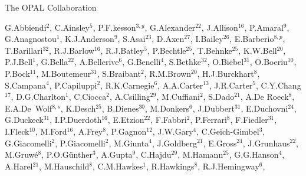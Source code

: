\documentclass[12pt,a4paper,twoside]{article}
\begin{document}
\begin{center}{\Large        The OPAL Collaboration
}\end{center}\bigskip
\begin{center}{
G.\thinspace Abbiendi$^{  2}$,
C.\thinspace Ainsley$^{  5}$,
P.F.\thinspace {\AA}kesson$^{  3,  y}$,
G.\thinspace Alexander$^{ 22}$,
J.\thinspace Allison$^{ 16}$,
P.\thinspace Amaral$^{  9}$,
G.\thinspace Anagnostou$^{  1}$,
K.J.\thinspace Anderson$^{  9}$,
S.\thinspace Asai$^{ 23}$,
D.\thinspace Axen$^{ 27}$,
I.\thinspace Bailey$^{ 26}$,
E.\thinspace Barberio$^{  8,   p}$,
T.\thinspace Barillari$^{ 32}$,
R.J.\thinspace Barlow$^{ 16}$,
R.J.\thinspace Batley$^{  5}$,
P.\thinspace Bechtle$^{ 25}$,
T.\thinspace Behnke$^{ 25}$,
K.W.\thinspace Bell$^{ 20}$,
P.J.\thinspace Bell$^{  1}$,
G.\thinspace Bella$^{ 22}$,
A.\thinspace Bellerive$^{  6}$,
G.\thinspace Benelli$^{  4}$,
S.\thinspace Bethke$^{ 32}$,
O.\thinspace Biebel$^{ 31}$,
O.\thinspace Boeriu$^{ 10}$,
P.\thinspace Bock$^{ 11}$,
M.\thinspace Boutemeur$^{ 31}$,
S.\thinspace Braibant$^{  2}$,
R.M.\thinspace Brown$^{ 20}$,
H.J.\thinspace Burckhart$^{  8}$,
S.\thinspace Campana$^{  4}$,
P.\thinspace Capiluppi$^{  2}$,
R.K.\thinspace Carnegie$^{  6}$,
A.A.\thinspace Carter$^{ 13}$,
J.R.\thinspace Carter$^{  5}$,
C.Y.\thinspace Chang$^{ 17}$,
D.G.\thinspace Charlton$^{  1}$,
C.\thinspace Ciocca$^{  2}$,
A.\thinspace Csilling$^{ 29}$,
M.\thinspace Cuffiani$^{  2}$,
S.\thinspace Dado$^{ 21}$,
A.\thinspace De Roeck$^{  8}$,
\mbox{E.A.\thinspace De Wolf$^{  8,  s}$},
K.\thinspace Desch$^{ 25}$,
B.\thinspace Dienes$^{ 30}$,
M.\thinspace Donkers$^{  6}$,
J.\thinspace Dubbert$^{ 31}$,
E.\thinspace Duchovni$^{ 24}$,
G.\thinspace Duckeck$^{ 31}$,
I.P.\thinspace Duerdoth$^{ 16}$,
E.\thinspace Etzion$^{ 22}$,
F.\thinspace Fabbri$^{  2}$,
P.\thinspace Ferrari$^{  8}$,
F.\thinspace Fiedler$^{ 31}$,
I.\thinspace Fleck$^{ 10}$,
M.\thinspace Ford$^{ 16}$,
A.\thinspace Frey$^{  8}$,
P.\thinspace Gagnon$^{ 12}$,
J.W.\thinspace Gary$^{  4}$,
C.\thinspace Geich-Gimbel$^{  3}$,
G.\thinspace Giacomelli$^{  2}$,
P.\thinspace Giacomelli$^{  2}$,
M.\thinspace Giunta$^{  4}$,
J.\thinspace Goldberg$^{ 21}$,
E.\thinspace Gross$^{ 24}$,
J.\thinspace Grunhaus$^{ 22}$,
M.\thinspace Gruw\'e$^{  8}$,
P.O.\thinspace G\"unther$^{  3}$,
A.\thinspace Gupta$^{  9}$,
C.\thinspace Hajdu$^{ 29}$,
M.\thinspace Hamann$^{ 25}$,
G.G.\thinspace Hanson$^{  4}$,
A.\thinspace Harel$^{ 21}$,
M.\thinspace Hauschild$^{  8}$,
C.M.\thinspace Hawkes$^{  1}$,
R.\thinspace Hawkings$^{  8}$,
R.J.\thinspace Hemingway$^{  6}$,
}
\end{center}
\end{document}
